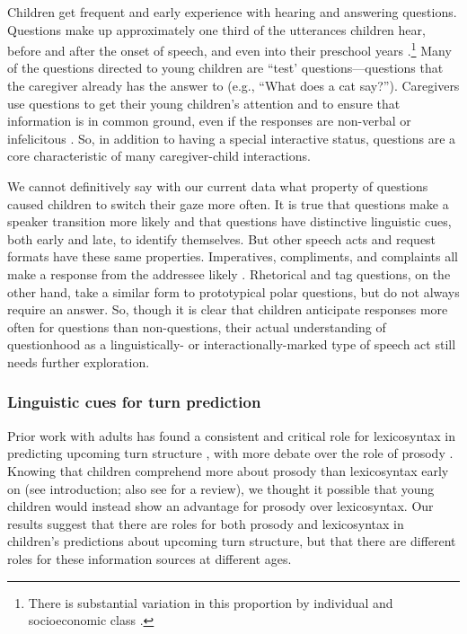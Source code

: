 \documentclass[authoryear, 12pt]{elsarticle}
\begin{document}
Children get frequent and early experience with hearing and answering questions. Questions make up approximately one third of the utterances children hear, before and after the onset of speech, and even into their preschool years \citep{fitneva2012, henning2005, shatz1979}.\footnote{There is substantial variation in this proportion by individual and socioeconomic class \citep{hart1992}.} Many of the questions directed to young children are ``test' questions---questions that the caregiver already has the answer to (e.g., ``What does a cat say?''). Caregivers use questions to get their young children's attention and to ensure that information is in common ground, even if the responses are non-verbal or infelicitous \citep{bruner1985, fitneva2012, snow1977}. So, in addition to having a special interactive status, questions are a core characteristic of many caregiver-child interactions.

We cannot definitively say with our current data what property of questions caused children to switch their gaze more often. It is true that questions make a speaker transition more likely and that questions have distinctive linguistic cues, both early and late, to identify themselves. But other speech acts and request formats have these same properties. Imperatives, compliments, and complaints all make a response from the addressee likely \citep{schegloff2007}. Rhetorical and tag questions, on the other hand, take a similar form to prototypical polar questions, but do not always require an answer. So, though it is clear that children anticipate responses more often for questions than non-questions, their actual understanding of questionhood as a linguistically- or interactionally-marked type of speech act still needs further exploration.

\subsubsection{Linguistic cues for turn prediction}

Prior work with adults has found a consistent and critical role for lexicosyntax in predicting upcoming turn structure \citep{de-ruiter2006, magyari2012}, with more debate over the role of prosody \citep{duncan1972, ford1996, torreiraUndRev}. Knowing that children comprehend more about prosody than lexicosyntax early on (see introduction; also see \citealp{speer2009} for a review), we thought it possible that young children would instead show an advantage for prosody over lexicosyntax. Our results suggest that there are roles for both prosody and lexicosyntax in children's predictions about upcoming turn structure, but that there are different roles for these information sources at different ages.
\end{document}
